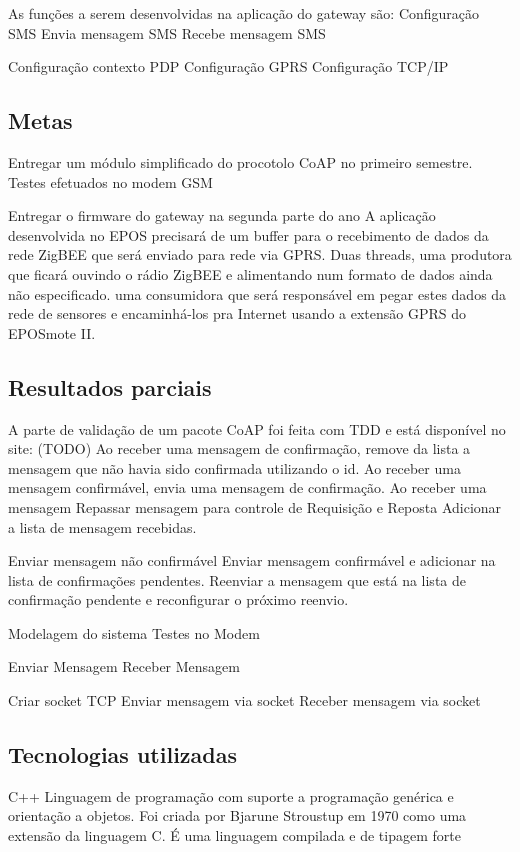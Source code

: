 As funções a serem desenvolvidas na aplicação do gateway são:
Configuração SMS
Envia mensagem SMS
Recebe mensagem SMS

Configuração contexto PDP
Configuração GPRS
Configuração TCP/IP

\subsection{Metas}
Entregar um módulo simplificado do procotolo CoAP no primeiro semestre.
Testes efetuados no modem GSM

Entregar o firmware do gateway na segunda parte do ano A aplicação desenvolvida no EPOS precisará de um buffer para o recebimento de dados da rede ZigBEE que será enviado para rede via GPRS. Duas threads, uma produtora que ficará ouvindo o rádio ZigBEE e alimentando num formato de dados ainda não especificado.  uma consumidora que será responsável em pegar estes dados da rede de sensores e encaminhá-los pra Internet usando a extensão GPRS do EPOSmote II.

\subsection{Resultados parciais}
A parte de validação de um pacote CoAP foi feita com TDD e está disponível no site: (TODO)
Ao receber uma mensagem de confirmação, remove da lista a mensagem que não havia sido confirmada utilizando o id.
Ao receber uma mensagem confirmável, envia uma mensagem de confirmação.
Ao receber uma mensagem
Repassar mensagem para controle de Requisição e Reposta Adicionar a lista de mensagem recebidas.

Enviar mensagem não confirmável
Enviar mensagem confirmável e adicionar na lista de confirmações pendentes.
Reenviar a mensagem que está na lista de confirmação pendente e reconfigurar o próximo reenvio.

Modelagem do sistema
Testes no Modem

Enviar Mensagem
Receber Mensagem

Criar socket TCP
Enviar mensagem via socket
Receber mensagem via socket



\subsection{Tecnologias utilizadas}
C++
Linguagem de programação com suporte a programação genérica e orientação a objetos. Foi criada por Bjarune Stroustup em 1970 como uma extensão da linguagem C. É uma linguagem compilada e de tipagem forte

